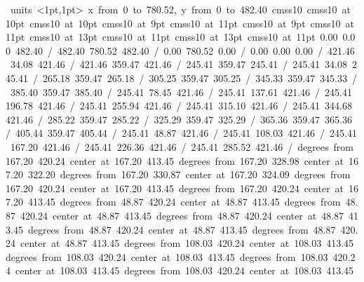 \hbox{\beginpicture
\setcoordinatesystem units <1pt,1pt>
\setplotarea x from 0 to 780.52, y from 0 to 482.40
\setlinear
\font\picfont cmss10\picfont
\font\picfont cmss10 at 10pt\picfont
\font\picfont cmss10 at 10pt\picfont
\font\picfont cmss10 at 9pt\picfont
\font\picfont cmss10 at 11pt\picfont
\font\picfont cmss10 at 9pt\picfont
\font\picfont cmss10 at 11pt\picfont
\font\picfont cmss10 at 13pt\picfont
\font\picfont cmss10 at 11pt\picfont
\font\picfont cmss10 at 13pt\picfont
\font\picfont cmss10 at 11pt\picfont
\setsolid
{} 0.00 0.00 482.40 /
 482.40 780.52 482.40 /
 0.00 780.52 0.00 /
 0.00 0.00 0.00 /
\setsolid
{} 421.46 34.08 421.46 /
 421.46 359.47 421.46 /
 245.41 359.47 245.41 /
 245.41 34.08 245.41 /
\setsolid
{} 265.18 359.47 265.18 /
\setsolid
{} 305.25 359.47 305.25 /
\setsolid
{} 345.33 359.47 345.33 /
\setsolid
{} 385.40 359.47 385.40 /
\setsolid
{} 245.41 78.45 421.46 /
\setsolid
{} 245.41 137.61 421.46 /
\setsolid
{} 245.41 196.78 421.46 /
\setsolid
{} 245.41 255.94 421.46 /
\setsolid
{} 245.41 315.10 421.46 /
\setsolid
{} 245.41 344.68 421.46 /
\setsolid
{} 285.22 359.47 285.22 /
\setsolid
{} 325.29 359.47 325.29 /
\setsolid
{} 365.36 359.47 365.36 /
\setsolid
{} 405.44 359.47 405.44 /
\setsolid
{} 245.41 48.87 421.46 /
\setsolid
{} 245.41 108.03 421.46 /
\setsolid
{} 245.41 167.20 421.46 /
\setsolid
{} 245.41 226.36 421.46 /
\setsolid
{} 245.41 285.52 421.46 /
 degrees from 167.20 420.24 center at 167.20 413.45
 degrees from 167.20 328.98 center at 167.20 322.20
 degrees from 167.20 330.87 center at 167.20 324.09
 degrees from 167.20 420.24 center at 167.20 413.45
 degrees from 167.20 420.24 center at 167.20 413.45
 degrees from 48.87 420.24 center at 48.87 413.45
 degrees from 48.87 420.24 center at 48.87 413.45
 degrees from 48.87 420.24 center at 48.87 413.45
 degrees from 48.87 420.24 center at 48.87 413.45
 degrees from 48.87 420.24 center at 48.87 413.45
 degrees from 108.03 420.24 center at 108.03 413.45
 degrees from 108.03 420.24 center at 108.03 413.45
 degrees from 108.03 420.24 center at 108.03 413.45
 degrees from 108.03 420.24 center at 108.03 413.45
}
